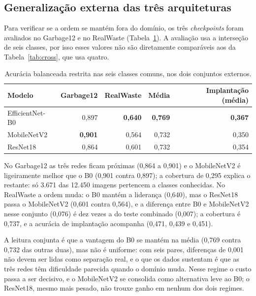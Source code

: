 \documentclass[11pt,a4paper]{article}
\begin{document}
	\subsection{Generalização externa das três arquiteturas}
	
	Para verificar se a ordem se mantém fora do domínio, os três \emph{checkpoints} foram avaliados no Garbage12 e no RealWaste (Tabela~\ref{tab:externa}). A avaliação usa a interseção de seis classes, por isso esses valores não são diretamente comparáveis aos da Tabela~\ref{tab:cross}, que usa quatro.
	
	\begin{table}[htbp]
		\centering
		\footnotesize
		\caption{Acurácia balanceada restrita nas seis classes comuns, nos dois conjuntos externos.}
		\label{tab:externa}
		\begin{tabular}{lrrrr}
			\toprule
			\textbf{Modelo} & \textbf{Garbage12} & \textbf{RealWaste} & \textbf{Média} & \textbf{Implantação (média)} \\
			\midrule
			EfficientNet-B0 & 0,897 & \textbf{0,640} & \textbf{0,769} & \textbf{0,367} \\
			MobileNetV2 & \textbf{0,901} & 0,564 & 0,732 & 0,350 \\
			ResNet18 & 0,864 & 0,601 & 0,732 & 0,354 \\
			\bottomrule
		\end{tabular}
	\end{table}
	
	No Garbage12 as três redes ficam próximas (0,864 a 0,901) e o MobileNetV2 é ligeiramente melhor que o B0 (0,901 contra 0,897); a cobertura de 0,295 explica o restante: só 3.671 das 12.450 imagens pertencem a classes conhecidas. No RealWaste a ordem muda: o B0 mantém a liderança (0,640), mas o ResNet18 passa o MobileNetV2 (0,601 contra 0,564), e a diferença entre B0 e MobileNetV2 nesse conjunto (0,076) é dez vezes a do teste combinado (0,007); a cobertura é 0,737, e a acurácia de implantação acompanha (0,471, 0,439 e 0,451).
	
	A leitura conjunta é que a vantagem do B0 se mantém na média (0,769 contra 0,732 das outras duas), mas não é uniforme: com seis pares, diferenças de 0,001 não devem ser lidas como separação real, e o que os dados sustentam é que as três redes têm dificuldade parecida quando o domínio muda. Nesse regime o custo passa a ser decisivo, e o MobileNetV2 se consolida como alternativa leve ao B0; o ResNet18, mesmo mais pesado, não trouxe ganho em nenhum dos dois regimes.
	
\end{document}
